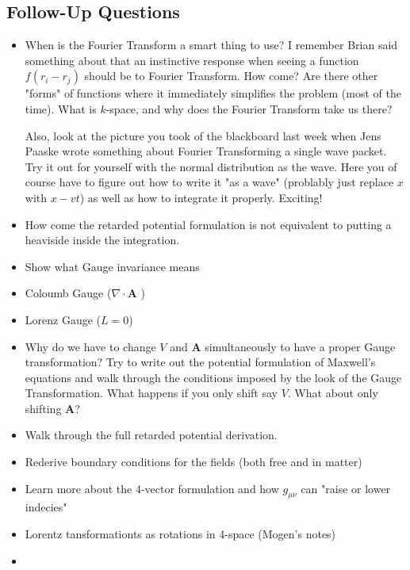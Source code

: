 \subsection*{Follow-Up Questions}
\begin{itemize}
    \item When is the Fourier Transform a smart thing to use? I remember Brian said something about that an instinctive response when seeing a function \(f(r_i - r_j)\) should be to Fourier Transform. How come? Are there other "forms" of functions where it immediately simplifies the problem (most of the time). What is \(k\)-space, and why does the Fourier Transform take us there? 
    
    Also, look at the picture you took of the blackboard last week when Jens Paaske wrote something about Fourier Transforming a single wave packet. Try it out for yourself with the normal distribution as the wave. Here you of course have to figure out how to write it "as a wave" (problably just replace \(x\) with \(x - vt\)) as well as how to integrate it properly. Exciting!
    \item How come the retarded potential formulation is not equivalent to putting a heaviside inside the integration.
    \item Show what Gauge invariance means
    \item Coloumb Gauge (\(\nabla \cdot \mathbf{A}\) )
    \item Lorenz Gauge (\(L = 0\))
    \item Why do we have to change \(V\) and \(\mathbf{A}\) simultaneously to have a proper Gauge transformation? Try to write out the potential formulation of Maxwell's equations and walk through the conditions imposed by the look of the Gauge Transformation. What happens if you only shift say \(V\). What about only shifting \(\mathbf{A}\)? 
    \item Walk through the full retarded potential derivation.
    \item Rederive boundary conditions for the fields (both free and in matter)
    \item Learn more about the 4-vector formulation and how \(g_{\mu \nu}\) can "raise or lower indecies"
    \item Lorentz tansformationts as rotations in 4-space (Mogen's notes)
    \item {}
\end{itemize}
